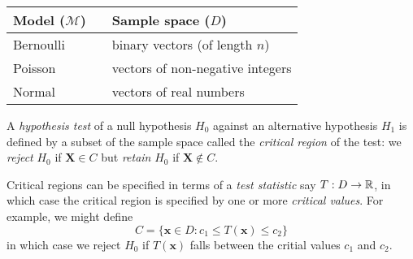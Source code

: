 \begin{center}
\begin{tabular}{lcl}\hline
Model ($\mathcal{M}$)	& & Sample space ($D$) \\ \hline
Bernoulli				& & binary vectors (of length $n$)\\
Poisson					& & vectors of non-negative integers \\
Normal					& & vectors of real numbers \\ \hline
\end{tabular}
\end{center}

%
\begin{definition}
A \emph{hypothesis test} of a null hypothesis $H_0$ against an alternative hypothesis $H_1$ is defined by a subset of the sample space called the \emph{critical region} of the test: we \emph{reject} $H_0$ if $\mathbf{X}\in C$ but \emph{retain} $H_0$ if $\mathbf{X}\notin C$.
\end{definition}

Critical regions can be specified in terms of a \emph{test statistic} say $T:D\to\mathbb{R}$, in which case the critical region is specified by one or more \emph{critical values}. For example, we might define
\[
C = \{\mathbf{x}\in D : c_1\leq T(\mathbf{x})\leq c_2\}
\]
in which case we reject $H_0$ if $T(\mathbf{x})$ falls between the critial values $c_1$ and $c_2$.

